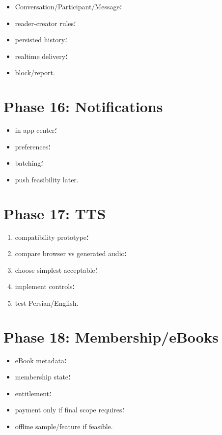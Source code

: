 \begin{itemize}
  \item Conversation/Participant/Message؛
  \item reader-creator rules؛
  \item persisted history؛
  \item realtime delivery؛
  \item block/report.
\end{itemize}

\section{Phase 16: Notifications}

\begin{itemize}
  \item in-app center؛
  \item preferences؛
  \item batching؛
  \item push feasibility later.
\end{itemize}

\section{Phase 17: TTS}

\begin{enumerate}
  \item compatibility prototype؛
  \item compare browser vs generated audio؛
  \item choose simplest acceptable؛
  \item implement controls؛
  \item test Persian/English.
\end{enumerate}

\section{Phase 18: Membership/eBooks}

\begin{itemize}
  \item eBook metadata؛
  \item membership state؛
  \item entitlement؛
  \item payment only if final scope requires؛
  \item offline sample/feature if feasible.
\end{itemize}

